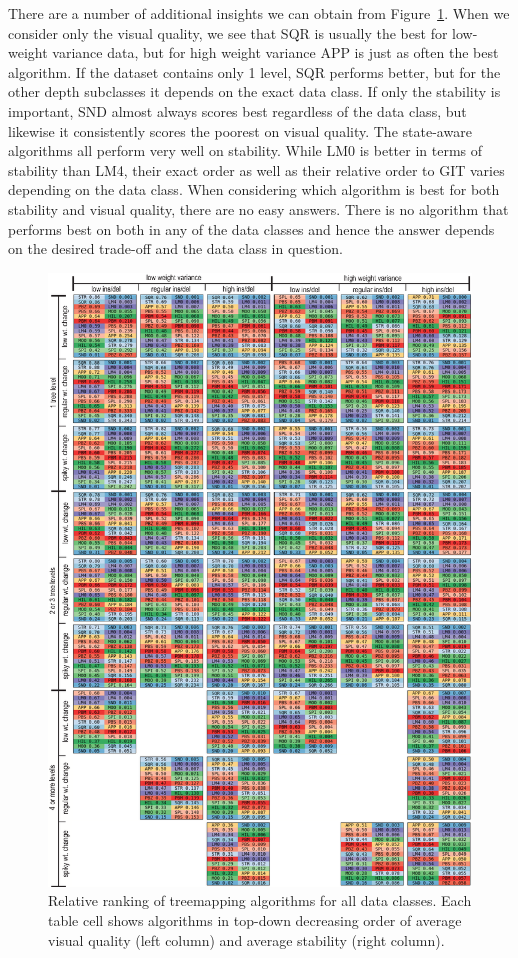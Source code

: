 There are a number of additional insights we can obtain from Figure~\ref{fig:rankingtable}. When we consider only the visual quality, we see that SQR is usually the best for low-weight variance data, but for high weight variance APP is just as often the best algorithm. If the dataset contains only 1 level, SQR performs better, but for the other depth subclasses it depends on the exact data class.
%
If only the stability is important, SND almost always scores best regardless of the data class, but likewise it consistently scores the poorest on visual quality. 
The state-aware algorithms all perform very well on stability. While LM0 is better in terms of stability than LM4, their exact order as well as their relative order to GIT varies depending on the data class.
%
When considering which algorithm is best for both stability and visual quality, there are no easy answers. There is no algorithm that performs best on both in any of the data classes and hence the answer depends on the desired trade-off and the data class in question.



\begin{figure}[htbp!]
\centering
\includegraphics[width=\linewidth]{figures/treemap-evaluation/rankingtable.png}
\caption{Relative ranking of treemapping algorithms for all data classes. Each table cell shows algorithms in top-down decreasing order of average visual quality (left column) and average stability (right column).}
\label{fig:rankingtable}
\end{figure}


